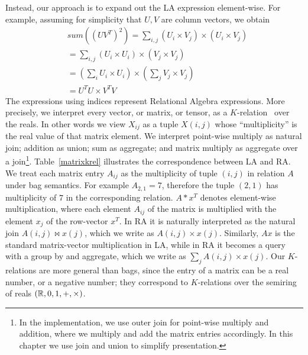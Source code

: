 Instead, our approach is to expand out the LA expression element-wise.
For example, assuming for simplicity that $U,V$ are column vectors, we
obtain
\begin{align*}
& sum((UV^T)^2) = \textstyle{\sum_{i,j}} (U_i \times V_j) \times (U_i \times V_j) \\
& = \textstyle{\sum_{i,j}}(U_i \times U_i) \times (V_j \times V_j) \\
& = ( \textstyle{\sum_i} U_i \times U_i) \times ( \textstyle{\sum_j} V_j \times V_j)  \\
& = U^TU \times V^TV
\end{align*}
%
The expressions using indices represent Relational Algebra
expressions.  More precisely, we interpret every vector, or matrix, or
tensor, as a $K$-relation~\cite{DBLP:conf/pods/GreenKT07} over the
reals. In other words we view $X_{ij}$ as a tuple $X(i,j)$ whose
``multiplicity'' is the real value of that matrix element.  We
interpret point-wise multiply as natural join; addition as union; sum
as aggregate; and matrix multiply as aggregate over a join\footnote{In
  the implementation, we use outer join for point-wise multiply and
  addition, where we multiply and add the matrix entries
  accordingly. In this chapter we use join and union to simplify
  presentation.}.
%
Table~\ref{matrixkrel} illustrates the correspondence between LA and
RA.  We treat each matrix entry $A_{ij}$ as the multiplicity of tuple
$(i, j)$ in relation $A$ under bag semantics. For example
$A_{2,1} = 7$, therefore the tuple $(2,1)$ has multiplicity of $7$ in
the corresponding relation. 
$A*x^T$ denotes element-wise
multiplication, where each element $A_{ij}$ of the matrix is
multiplied with the element $x_j$ of the row-vector $x^T$.  In RA it
is naturally interpreted as the natural join $A(i,j) \Join x(j)$,
which we write as $A(i,j) \times x(j)$.  Similarly, $Ax$ is the standard
matrix-vector multiplication in LA, while in RA it becomes a query
with a group by and aggregate, which we write as $\sum_j A(i,j) \times x(j)$.
Our $K$-relations are more general than bags, since the entry of a
matrix can be a real number, or a negative number; they correspond to
$K$-relations over the semiring of reals $(\mathbb R, 0, 1, +, \times)$.

